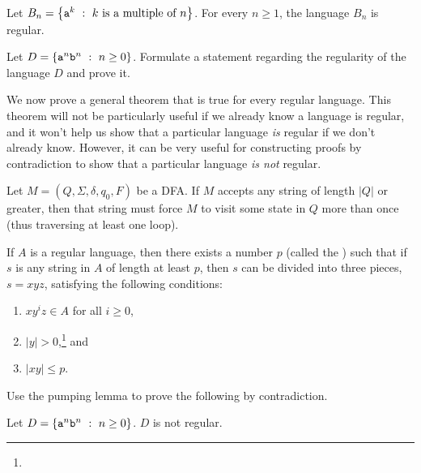 \documentclass[twoside,letterpaper,openany]{book}
\begin{document}
\begin{thm}
Let $B_n = \left\lbrace {\texttt{a}}^k\ :\ k~\textrm{is a multiple of}~n \right\rbrace$. For every $n \geq 1$, the language $B_n$ is regular.
\end{thm}

\begin{exer}
Let $D = \left\lbrace {\texttt{a}}^n {\texttt{b}}^n\ :\ n \geq 0 \right\rbrace$. Formulate a statement regarding the regularity of the language $D$ and prove it.
\end{exer}

\begin{discussion}
We now prove a general theorem that is true for every regular language. This theorem will not be particularly useful if we already know a language is regular, and it won't help us show that a particular language \emph{is} regular if we don't already know. However, it can be very useful for constructing proofs by contradiction to show that a particular language \emph{is not} regular.
\end{discussion}

\begin{lemma}
Let $M = (Q, \Sigma, \delta, q_0, F)$ be a DFA. If $M$ accepts any string of length $|Q|$ or greater, then that string must force $M$ to visit some state in $Q$ more than once (thus traversing at least one loop).
\end{lemma}

\begin{thm}
If $A$ is a regular language, then there exists a number $p$ (called the ) such that if $s$ is any string in $A$ of length at least $p$, then $s$ can be divided into three pieces, $s = xyz$, satisfying the following conditions:
\begin{enumerate}
\item $xy^iz \in A$ for all $i \geq 0$,
\item $|y| > 0$,\footnote{} and
\item $|xy| \leq p$.
\end{enumerate}
\end{thm}

\begin{discussion}
Use the pumping lemma to prove the following by contradiction.
\end{discussion}

\begin{thm}
Let $D = \left\lbrace {\texttt{a}}^n {\texttt{b}}^n\ :\ n \geq 0 \right\rbrace$. $D$ is not regular.
\end{thm}
\end{document}
